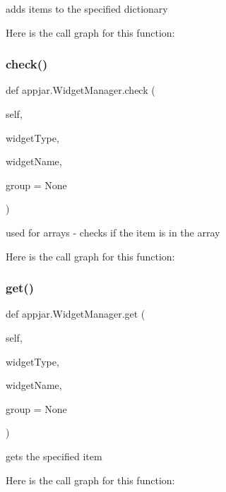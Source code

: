 \begin{DoxyVerb}adds items to the specified dictionary \end{DoxyVerb}
 Here is the call graph for this function\+:
\mbox{\label{classappjar_1_1_widget_manager_a51183226169b8a80f750d0c68b7eeb95}} 
\subsubsection{\texorpdfstring{check()}{check()}}
{\footnotesize\ttfamily def appjar.\+Widget\+Manager.\+check (\begin{DoxyParamCaption}\item[{}]{self,  }\item[{}]{widget\+Type,  }\item[{}]{widget\+Name,  }\item[{}]{group = {\ttfamily None} }\end{DoxyParamCaption})}

\begin{DoxyVerb}used for arrays - checks if the item is in the array \end{DoxyVerb}
 Here is the call graph for this function\+:
\mbox{\label{classappjar_1_1_widget_manager_aa7f8a7e8180832988cb72181bb589701}} 
\subsubsection{\texorpdfstring{get()}{get()}}
{\footnotesize\ttfamily def appjar.\+Widget\+Manager.\+get (\begin{DoxyParamCaption}\item[{}]{self,  }\item[{}]{widget\+Type,  }\item[{}]{widget\+Name,  }\item[{}]{group = {\ttfamily None} }\end{DoxyParamCaption})}

\begin{DoxyVerb}gets the specified item \end{DoxyVerb}
 Here is the call graph for this function\+:
\mbox{\label{classappjar_1_1_widget_manager_a27966c0641e12877b49f89d68119777c}} 
